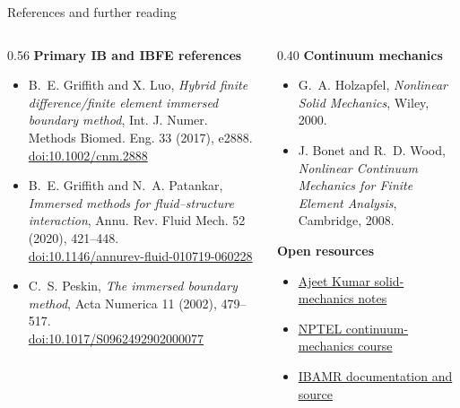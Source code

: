 \documentclass[aspectratio=169,11pt]{beamer}
\begin{document}
\begin{frame}{References and further reading}
\footnotesize
\begin{columns}[T,onlytextwidth]
\begin{column}{0.56\textwidth}
\textbf{Primary IB and IBFE references}
\begin{itemize}\itemsep4pt
  \item B.~E. Griffith and X. Luo,
  \emph{Hybrid finite difference/finite element immersed boundary method},
  Int. J. Numer. Methods Biomed. Eng. 33 (2017), e2888.\\
  \href{https://doi.org/10.1002/cnm.2888}{doi:10.1002/cnm.2888}
  \item B.~E. Griffith and N.~A. Patankar,
  \emph{Immersed methods for fluid--structure interaction},
  Annu. Rev. Fluid Mech. 52 (2020), 421--448.\\
  \href{https://doi.org/10.1146/annurev-fluid-010719-060228}{doi:10.1146/annurev-fluid-010719-060228}
  \item C.~S. Peskin,
  \emph{The immersed boundary method},
  Acta Numerica 11 (2002), 479--517.\\
  \href{https://doi.org/10.1017/S0962492902000077}{doi:10.1017/S0962492902000077}
\end{itemize}
\end{column}
\begin{column}{0.40\textwidth}
\textbf{Continuum mechanics}
\begin{itemize}\itemsep4pt
  \item G.~A. Holzapfel, \emph{Nonlinear Solid Mechanics}, Wiley, 2000.
  \item J. Bonet and R.~D. Wood, \emph{Nonlinear Continuum Mechanics for Finite Element Analysis}, Cambridge, 2008.
\end{itemize}
\textbf{Open resources}
\begin{itemize}\itemsep4pt
  \item \href{https://web.iitd.ac.in/~ajeetk/APL104.html}{Ajeet Kumar solid-mechanics notes}
  \item \href{https://onlinecourses.nptel.ac.in/noc19_ch27/preview}{NPTEL continuum-mechanics course}
  \item \href{https://ibamr.github.io}{IBAMR documentation and source}
\end{itemize}
\end{column}
\end{columns}
\end{frame}
\end{document}
